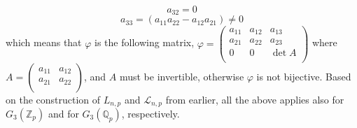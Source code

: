 \documentclass[12pt]{article}
\begin{document}
$$a_{32}=0$$
$$a_{33}=(a_{11}a_{22}-a_{12}a_{21})\neq 0
$$
which means that $\varphi$ is the following matrix, $\varphi=\begin{pmatrix}
a_{11} & a_{12} & a_{13}\\
a_{21} & a_{22} & a_{23}\\
0 & 0 & \det A\\
\end{pmatrix}
$
where $A=\begin{pmatrix}
a_{11} & a_{12}\\
a_{21} & a_{22}\\
\end{pmatrix}
$, and $A$ must be invertible, otherwise $\varphi$ is not bijective. Based on the construction of $L_{n,p}$ and $\mathcal{L}_{n,p}$ from earlier, all the above applies also for $G_3(\mathbb{Z}_p)$ and for $G_3(\mathbb{Q}_p)$, respectively.
\end{document}
